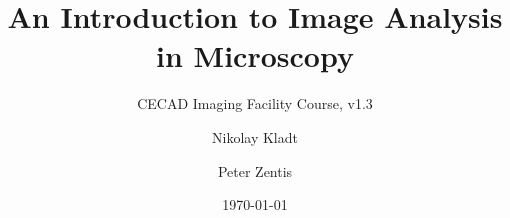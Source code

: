 \documentclass[12pt,twoside, parskip=half, headsepline=on, chapterprefix=true, draft=off]{scrbook}
\newcounter{taskcounter}
\begin{document}
\title{An Introduction to Image Analysis in Microscopy}
\subtitle{CECAD Imaging Facility Course, v1.3} 
\author{Nikolay Kladt \and Peter Zentis}
\date{\today}
\publishers{Imaging Facility\\Cluster of Excellence -- Cellular Stress Responses in Aging-Associated Diseases\\University of Cologne}

\maketitle



\tableofcontents



\setcounter{taskcounter}{0}


\setcounter{taskcounter}{0}


\setcounter{taskcounter}{0}




\end{document}
